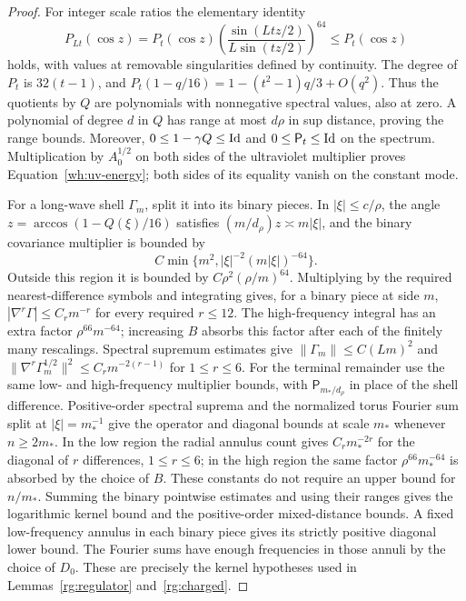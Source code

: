 \begin{proof}
For integer scale ratios the elementary identity
\[
 P_{Lt}(\cos z)=P_t(\cos z)
       \left(\frac{\sin(Ltz/2)}{L\sin(tz/2)}\right)^{64}
       \le P_t(\cos z)
\]
holds, with values at removable singularities defined by continuity.
The degree of $P_t$ is $32(t-1)$, and
$P_t(1-q/16)=1-(t^2-1)q/3+O(q^2)$.
Thus the quotients by $Q$ are polynomials with nonnegative spectral
values, also at zero.  A polynomial of degree $d$ in $Q$ has range at
most $d\rho$ in sup distance, proving the range bounds.
Moreover, $0\le1-\gamma Q\le\operatorname{Id}$ and $0\le\mathsf P_t\le\operatorname{Id}$
on the spectrum.  Multiplication by $A_0^{1/2}$ on both sides
of the ultraviolet multiplier proves Equation~\eqref{wh:uv-energy};
both sides of its equality vanish on the constant mode.

For a long-wave shell $\Gamma_m$, split it into its binary pieces.
In $|\xi|\le c/\rho$, the angle
$z=\arccos(1-Q(\xi)/16)$ satisfies
$(m/d_\rho)z\asymp m|\xi|$, and the binary covariance multiplier is
bounded by
\[
 C\min\{m^2,|\xi|^{-2}(m|\xi|)^{-64}\}.
\]
Outside this region it is bounded by
$C\rho^2(\rho/m)^{64}$.  Multiplying by the required nearest-difference
symbols and integrating gives, for a binary piece at side $m$,
$|\nabla^r\Gamma|\le C_rm^{-r}$ for every required $r\le12$.
The high-frequency integral has an extra factor $\rho^{66}m^{-64}$;
increasing $B$ absorbs this factor after each of the finitely many
rescalings.  Spectral supremum estimates give
$\|\Gamma_m\|\le C(Lm)^2$ and
$\|\nabla^r\Gamma_m^{1/2}\|^2\le C_rm^{-2(r-1)}$ for $1\le r\le6$.
For the terminal remainder use the same low- and high-frequency
multiplier bounds, with $\mathsf P_{m_*/d_\rho}$ in place of the
shell difference.  Positive-order spectral suprema and the normalized
torus Fourier sum split at $|\xi|=m_*^{-1}$ give the operator and
diagonal bounds at scale $m_*$ whenever $n\ge2m_*$.  In the low
region the radial annulus count gives $C_rm_*^{-2r}$ for the
diagonal of $r$ differences, $1\le r\le6$; in the high region the
same factor $\rho^{66}m_*^{-64}$ is absorbed by the choice of $B$.
These constants do not require an upper bound for $n/m_*$.
Summing the binary pointwise estimates and using their ranges gives
the logarithmic kernel bound and the positive-order mixed-distance
bounds.  A fixed low-frequency annulus in each
binary piece gives its strictly positive diagonal lower bound.  The
Fourier sums have enough frequencies in those annuli by the choice of
$D_0$.  These are precisely the kernel hypotheses used in
Lemmas~\ref{rg:regulator} and~\ref{rg:charged}.


\end{proof}
